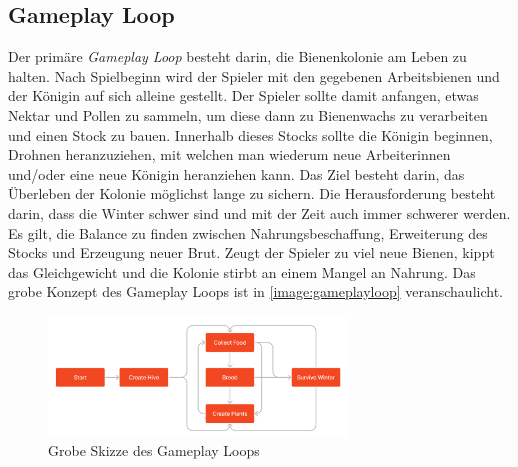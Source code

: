 \subsection{Gameplay Loop}
Der primäre \textit{Gameplay Loop} besteht darin, die Bienenkolonie am Leben zu halten. Nach Spielbeginn wird der Spieler mit den gegebenen Arbeitsbienen und der Königin auf sich alleine gestellt. Der Spieler sollte damit anfangen, etwas Nektar und Pollen zu sammeln, um diese dann zu Bienenwachs zu verarbeiten und einen Stock zu bauen. Innerhalb dieses Stocks sollte die Königin beginnen, Drohnen heranzuziehen, mit welchen man wiederum neue Arbeiterinnen und/oder eine neue Königin heranziehen kann. Das Ziel besteht darin, das Überleben der Kolonie möglichst lange zu sichern. Die Herausforderung besteht darin, dass die Winter schwer sind und mit der Zeit auch immer schwerer werden. Es gilt, die Balance zu finden zwischen Nahrungsbeschaffung, Erweiterung des Stocks und Erzeugung neuer Brut. Zeugt der Spieler zu viel neue Bienen, kippt das Gleichgewicht und die Kolonie stirbt an einem Mangel an Nahrung. Das grobe Konzept des Gameplay Loops ist in \autoref{image:gameplayloop} veranschaulicht.

\begin{figure}
    \begin{center}
        \includegraphics[width=300px]{0.bilder/gameplayloop.PNG}
    \end{center}
    \caption{Grobe Skizze des Gameplay Loops} \label{image:gameplayloop}
\end{figure}
